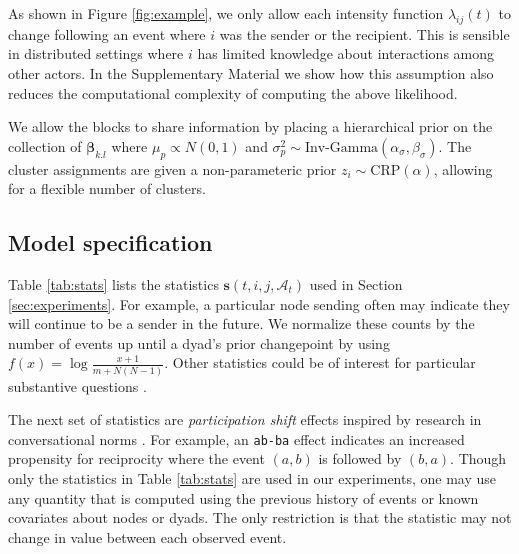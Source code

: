 As shown in Figure \ref{fig:example}, we only allow each intensity function $\lambda_{ij}(t)$ to change following an event where $i$ was the sender or the recipient.
This is sensible in distributed settings where $i$ has limited knowledge about interactions among other actors.
In the Supplementary Material we show how this assumption also reduces the computational complexity of computing the above likelihood.

We allow the blocks to share information by placing a hierarchical prior on the collection of $\boldsymbol{\beta}_{k.l}$ where $\mu_p \propto N(0,1)$ and $\sigma_p^2 \sim \mbox{Inv-Gamma}(\alpha_{\sigma},\beta_{\sigma})$.
The cluster assignments are given a non-parameteric prior $z_i \sim \mbox{CRP}(\alpha)$, allowing for a flexible number of clusters.

\subsection{Model specification}
\label{sec:specification}


Table \ref{tab:stats}  lists the statistics  $\mathbf{s}(t,i,j,\mathcal{A}_t)$ used in Section \ref{sec:experiments}.
For example, a particular node sending often may indicate they will continue to be a sender in the future.
We normalize these counts by the number of events up until a dyad's prior changepoint by using $f(x) = \log \frac{x+1}{m + N(N-1)}$. %
Other statistics could be of interest for particular substantive questions \cite{Butts2008,Vu2011}.  

The next set of statistics are \emph{participation shift} effects inspired by research in conversational norms \cite{Gibson2003}.
For example, an \texttt{ab-ba} effect indicates an increased propensity for reciprocity where the event $(a,b)$ is followed by $(b,a)$.
Though only the statistics in Table \ref{tab:stats} are used in our experiments, one may use any quantity that is computed using the previous history of events or known covariates about nodes or dyads.
The only restriction is that the statistic may not change in value between each observed event.%

